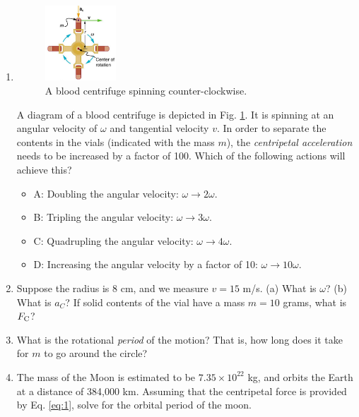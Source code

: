 \documentclass{article}
\begin{document}
\begin{enumerate}
\item 
\begin{figure}[ht]
\centering
\includegraphics[width=0.25\textwidth]{cent.png}
\caption{\label{fig:cent} A blood centrifuge spinning counter-clockwise.}
\end{figure}

A diagram of a blood centrifuge is depicted in Fig. \ref{fig:cent}.  It is spinning at an angular velocity of $\omega$ and tangential velocity $v$.  In order to separate the contents in the vials (indicated with the mass $m$), the \textit{centripetal acceleration} needs to be increased by a factor of 100.  Which of the following actions will achieve this?
\begin{itemize}
\item A: Doubling the angular velocity: $\omega \rightarrow 2\omega$.
\item B: Tripling the angular velocity: $\omega \rightarrow 3\omega$.
\item C: Quadrupling the angular velocity: $\omega \rightarrow 4\omega$.
\item D: Increasing the angular velocity by a factor of 10: $\omega \rightarrow 10\omega$.
\end{itemize}
\item Suppose the radius is 8 cm, and we measure $v = 15$ m/s.  (a) What is $\omega$?  (b) What is $a_C$?  If solid contents of the vial have a mass $m = 10$ grams, what is $F_{\rm C}$? \\ \vspace{2cm}
\item What is the rotational \textit{period} of the motion?  That is, how long does it take for $m$ to go around the circle? \\ \vspace{2cm}
\item The mass of the Moon is estimated to be $7.35 \times 10^{22}$ kg, and orbits the Earth at a distance of 384,000 km.  Assuming that the centripetal force is provided by Eq. \ref{eq:1}, solve for the orbital period of the moon.
\end{enumerate}
\end{document}
